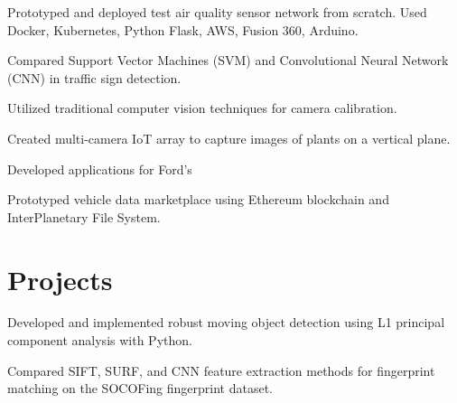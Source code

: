 \documentclass[]{deedy-resume-openfont}
\begin{document}
\begin{minipage}[t]{0.70\textwidth}
\begin{tightemize}
\item Prototyped and deployed test air quality sensor network from scratch. Used Docker, Kubernetes, Python Flask, AWS, Fusion 360, Arduino.
\item Compared Support Vector Machines (SVM) and Convolutional Neural Network (CNN) in traffic sign detection.


\end{tightemize}
\sectionsep

\begin{tightemize}
\item Utilized traditional computer vision techniques for camera calibration.
\item Created multi-camera IoT array to capture images of plants on a vertical plane.
\end{tightemize}
\sectionsep

\begin{tightemize}%

\item Developed applications for Ford's 
\item Prototyped vehicle data marketplace using Ethereum blockchain and InterPlanetary File System.

\end{tightemize}
\sectionsep



\section{Projects}
\begin{tightemize}
\item Developed and implemented robust moving object detection using L1 principal component analysis with Python.
\end{tightemize}
\sectionsep

\begin{tightemize}
\item Compared SIFT, SURF, and CNN feature extraction methods for fingerprint matching on the SOCOFing fingerprint dataset.
\end{tightemize}
\sectionsep


\end{minipage}
\end{document}
